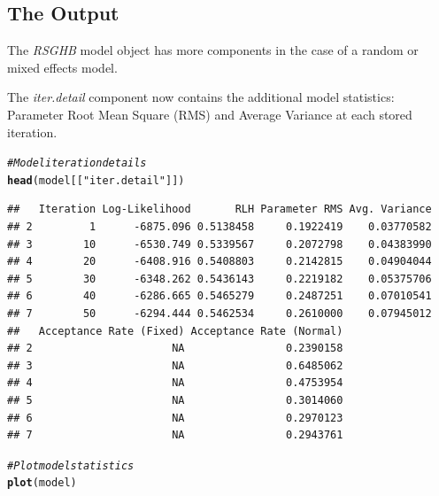 \documentclass{article}\usepackage[]{graphicx}\usepackage[]{color}
\makeatletter
\newcommand{\hlstr}[1]{\textcolor[rgb]{0.192,0.494,0.8}{#1}}%
\newcommand{\hlcom}[1]{\textcolor[rgb]{0.678,0.584,0.686}{\textit{#1}}}%
\newcommand{\hlstd}[1]{\textcolor[rgb]{0.345,0.345,0.345}{#1}}%
\newcommand{\hlkwd}[1]{\textcolor[rgb]{0.737,0.353,0.396}{\textbf{#1}}}%
\newenvironment{kframe}{%
 \def\at@end@of@kframe{}%
 \ifinner\ifhmode%
  \def\at@end@of@kframe{\end{minipage}}%
  \begin{minipage}{\columnwidth}%
 \fi\fi%
 \def\FrameCommand##1{\hskip\@totalleftmargin \hskip-\fboxsep
 \colorbox{shadecolor}{##1}\hskip-\fboxsep
     \hskip-\linewidth \hskip-\@totalleftmargin \hskip\columnwidth}%
 \MakeFramed {\advance\hsize-\width
   \@totalleftmargin\z@ \linewidth\hsize
   \@setminipage}}%
 {\par\unskip\endMakeFramed%
 \at@end@of@kframe}
\newenvironment{knitrout}{}{} %
\makeatother
\begin{document}
\subsection*{The Output}

The \emph{RSGHB} model object has more components in the case of a random or mixed effects model.

The \emph{iter.detail} component now contains the additional model statistics: Parameter Root Mean Square (RMS) and Average Variance at each stored iteration.

\begin{knitrout}
\color{fgcolor}\begin{kframe}
\begin{alltt}
\hlcom{# Model iteration details}
\hlkwd{head}\hlstd{(model[[}\hlstr{"iter.detail"}\hlstd{]])}
\end{alltt}
\begin{verbatim}
##   Iteration Log-Likelihood       RLH Parameter RMS Avg. Variance
## 2         1      -6875.096 0.5138458     0.1922419    0.03770582
## 3        10      -6530.749 0.5339567     0.2072798    0.04383990
## 4        20      -6408.916 0.5408803     0.2142815    0.04904044
## 5        30      -6348.262 0.5436143     0.2219182    0.05375706
## 6        40      -6286.665 0.5465279     0.2487251    0.07010541
## 7        50      -6294.444 0.5462534     0.2610000    0.07945012
##   Acceptance Rate (Fixed) Acceptance Rate (Normal)
## 2                      NA                0.2390158
## 3                      NA                0.6485062
## 4                      NA                0.4753954
## 5                      NA                0.3014060
## 6                      NA                0.2970123
## 7                      NA                0.2943761
\end{verbatim}
\begin{alltt}
\hlcom{# Plot model statistics}
\hlkwd{plot}\hlstd{(model)}
\end{alltt}
\end{kframe}

\end{knitrout}
\end{document}
